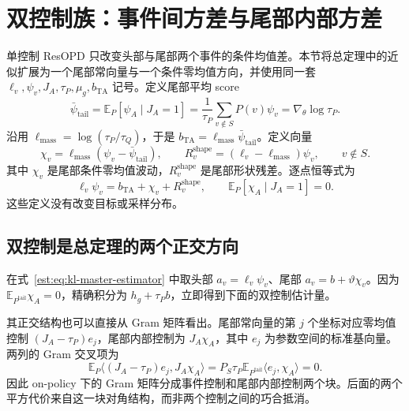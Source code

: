 \documentclass[lang=cn,scheme=chinese,openany]{../book/elegantbook}
\newcommand{\E}{\mathbb E}
\newcommand{\tail}{\mathrm{tail}}
\begin{document}


\section{双控制族：事件间方差与尾部内部方差}
\label{est:sec:kl-two-controls}

单控制 ResOPD 只改变头部与尾部两个事件的条件均值差。本节将总定理中的近似扩展为一个尾部常向量与一个条件零均值方向，并使用同一套 $\ell_v,\psi_v,J_A,\tau_P,\mu_g,b_{\mathrm{TA}}$ 记号。定义尾部平均 score
\begin{equation*}
 \bar\psi_{\tail}=\E_P[\psi_A\mid J_A=1]
 =\frac{1}{\tau_P}\sum_{v\notin S}P(v)\psi_v
 =\nabla_\theta\log\tau_P.
\end{equation*}
沿用 $\ell_{\mathrm{mass}}=\log(\tau_P/\tau_Q)$，于是 $b_{\mathrm{TA}}=\ell_{\mathrm{mass}}\bar\psi_{\tail}$。定义向量
\begin{equation*}
 \chi_v=\ell_{\mathrm{mass}}(\psi_v-\bar\psi_{\tail}),\qquad
 R_v^{\mathrm{shape}}=(\ell_v-\ell_{\mathrm{mass}})\psi_v,\qquad v\notin S.
\end{equation*}
其中 $\chi_v$ 是尾部条件零均值波动，$R_v^{\mathrm{shape}}$ 是尾部形状残差。逐点恒等式为
\begin{equation}
 \ell_v\psi_v=b_{\mathrm{TA}}+\chi_v+R_v^{\mathrm{shape}},\qquad
 \E_P[\chi_A\mid J_A=1]=0.
 \label{est:eq:kl-tail-fine-decomposition}
\end{equation}
这些定义没有改变目标或采样分布。

\subsection{双控制是总定理的两个正交方向}

在式~\eqref{est:eq:kl-master-estimator} 中取头部 $a_v=\ell_v\psi_v$、尾部 $a_v=b+\vartheta\chi_v$。因为 $\E_{P^{\tail}}\chi_A=0$，精确积分为 $h_g+\tau_Pb$，立即得到下面的双控制估计量。

其正交结构也可以直接从 Gram 矩阵看出。尾部常向量的第 $j$ 个坐标对应零均值控制 $(J_A-\tau_P)e_j$，尾部内部控制为 $J_A\chi_A$，其中 $e_j$ 为参数空间的标准基向量。两列的 Gram 交叉项为
\begin{equation*}
 \E_P\langle(J_A-\tau_P)e_j,J_A\chi_A\rangle
 =P_S\tau_P\E_{P^{\tail}}\langle e_j,\chi_A\rangle=0.
\end{equation*}
因此 on-policy 下的 Gram 矩阵分成事件控制和尾部内部控制两个块。后面的两个平方代价来自这一块对角结构，而非两个控制之间的巧合抵消。
\end{document}
